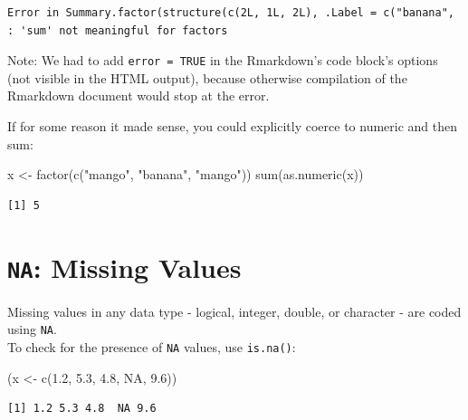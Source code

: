 \documentclass[
]{book}
\makeatletter
\newenvironment{Shaded}{\begin{snugshade}}{\end{snugshade}}
\newcommand{\ConstantTok}[1]{\textcolor[rgb]{0.00,0.00,0.00}{#1}}
\newcommand{\FloatTok}[1]{\textcolor[rgb]{0.00,0.00,0.81}{#1}}
\newcommand{\FunctionTok}[1]{\textcolor[rgb]{0.00,0.00,0.00}{#1}}
\newcommand{\NormalTok}[1]{#1}
\newcommand{\OtherTok}[1]{\textcolor[rgb]{0.56,0.35,0.01}{#1}}
\newcommand{\StringTok}[1]{\textcolor[rgb]{0.31,0.60,0.02}{#1}}
\newenvironment{kframe}{%
\medskip{}
\setlength{\fboxsep}{.8em}
 \def\at@end@of@kframe{}%
 \ifinner\ifhmode%
  \def\at@end@of@kframe{\end{minipage}}%
  \begin{minipage}{\columnwidth}%
 \fi\fi%
 \def\FrameCommand##1{\hskip\@totalleftmargin \hskip-\fboxsep
 \colorbox{shadecolor}{##1}\hskip-\fboxsep
     \hskip-\linewidth \hskip-\@totalleftmargin \hskip\columnwidth}%
 \MakeFramed {\advance\hsize-\width
   \@totalleftmargin\z@ \linewidth\hsize
   \@setminipage}}%
 {\par\unskip\endMakeFramed%
 \at@end@of@kframe}
\newenvironment{rmdblock}[1]
  {
  \begin{itemize}
  \renewcommand{\labelitemi}{
    \raisebox{-.7\height}[0pt][0pt]{
      {\setkeys{Gin}{width=3em,keepaspectratio}\texttt{[image: images/\#1]}}
    }
  }
  \setlength{\fboxsep}{1em}
  \begin{kframe}
  \item
  }
  {
  \end{kframe}
  \end{itemize}
  }
\newenvironment{note}
  {\begin{rmdblock}{note}}
  {\end{rmdblock}}
\makeatother
\begin{document}
\begin{verbatim}
Error in Summary.factor(structure(c(2L, 1L, 2L), .Label = c("banana", : 'sum' not meaningful for factors
\end{verbatim}

\begin{note}
Note: We had to add \texttt{error\ =\ TRUE} in the Rmarkdown's code
block's options (not visible in the HTML output), because otherwise
compilation of the Rmarkdown document would stop at the error.
\end{note}

If for some reason it made sense, you could explicitly coerce to numeric and then sum:

\begin{Shaded}
\begin{Highlighting}[]
\NormalTok{x }\OtherTok{\textless{}{-}} \FunctionTok{factor}\NormalTok{(}\FunctionTok{c}\NormalTok{(}\StringTok{"mango"}\NormalTok{, }\StringTok{"banana"}\NormalTok{, }\StringTok{"mango"}\NormalTok{))}
\FunctionTok{sum}\NormalTok{(}\FunctionTok{as.numeric}\NormalTok{(x))}
\end{Highlighting}
\end{Shaded}

\begin{verbatim}
[1] 5
\end{verbatim}

\hypertarget{na-missing-values}{%
\section{\texorpdfstring{\texttt{NA}: Missing Values}{NA: Missing Values}}\label{na-missing-values}}

Missing values in any data type - logical, integer, double, or character - are coded using \texttt{NA}.\\
To check for the presence of \texttt{NA} values, use \texttt{is.na()}:

\begin{Shaded}
\begin{Highlighting}[]
\NormalTok{(x }\OtherTok{\textless{}{-}} \FunctionTok{c}\NormalTok{(}\FloatTok{1.2}\NormalTok{, }\FloatTok{5.3}\NormalTok{, }\FloatTok{4.8}\NormalTok{, }\ConstantTok{NA}\NormalTok{, }\FloatTok{9.6}\NormalTok{))}
\end{Highlighting}
\end{Shaded}

\begin{verbatim}
[1] 1.2 5.3 4.8  NA 9.6
\end{verbatim}
\end{document}

